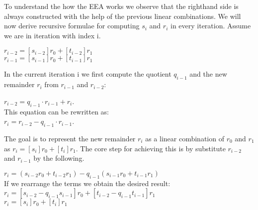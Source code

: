 \noindent
To understand the how the EEA works we observe that the righthand side is always constructed with the help of the previous linear combinations. We will now derive recursive formulae for computing $s_i$ and $r_i$ in every iteration. Assume we are in iteration with index i. 

\begin{infobox}
$r_{i - 2} = [s_{i-2}]r_0 +[t_{i-2}]r_1$\\
$r_{i-1} = [s_{i-1}]r_0 +[t_{i-1}]r_1$
\end{infobox}

\noindent
In the current iteration i we first compute the quotient $q_{i-1}$ and the new remainder $r_i$ from $r_{i-1}$ and $r_{i-2}$:

\begin{infobox}
$r_{i-2} = q_{i-1} \cdot r_{i-1}+r_i$.\\
This equation can be rewritten as:\\
$r_i = r_{i-2}-q_{i-1} \cdot r_{i-1}$.
\end{infobox}


\noindent
The goal is to represent the new remainder $r_i$ as a linear combination of $r_0$ and $r_1$ as $r_i = [s_i]r_0 +[t_i]r_1$. The core step for achieving this is by substitute $r_{i-2}$ and $r_{i-1}$ by the following.

\noindent
\begin{infobox}
$r_i = (s_{i-2}r_0+t_{i-2}r_1)-q_{i-1}(s_{i-1}r_0+t_{i-1}r_1)$\\
If we rearrange the terms we obtain the desired result:\\
$r_i = [s_{i-2}-q_{i-1}s_{i-1}]r_0 +[t_{i-2}-q_{i-1}t_{i-1}]r_1$\\
$r_i = [s_i]r_0 +[t_i]r_1$
\end{infobox}